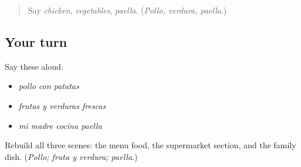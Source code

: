 \label{lesson:ES-C403-food-recall-2}



\begin{quote}
Say \emph{chicken}, \emph{vegetables}, \emph{paella}. (\emph{Pollo, verdura, paella}.)
\end{quote}

\subsection*{Your turn}
Say these aloud:

\begin{itemize}
\raggedright
  \item \emph{pollo con patatas}
  \item \emph{frutas y verduras frescas}
  \item \emph{mi madre cocina paella}
\end{itemize}

\begin{tcolorbox}[breakable,colback=teal!4,colframe=teal!35!black,title={Before you move on}]
Rebuild all three scenes: the menu food, the supermarket section, and the family dish. (\emph{Pollo; fruta y verdura; paella}.)
\end{tcolorbox}
